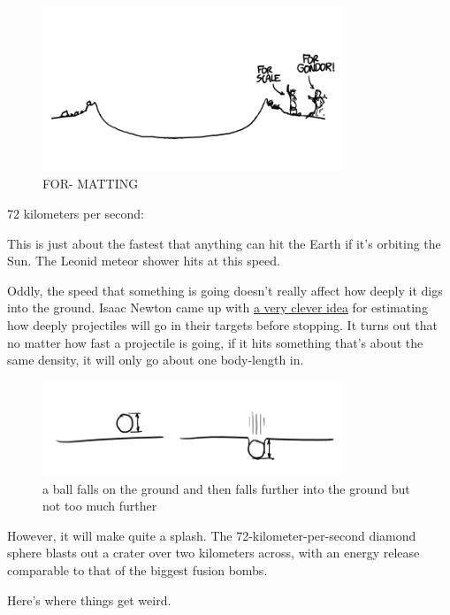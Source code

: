 \begin{figure}[!htbp]
\centering
\includegraphics[scale=0.5, max width=0.8\textwidth]{imgs/a/20/diamond_11.png}
\caption{FOR- MATTING}
\end{figure}

{72 kilometers per second:}

{This is just about the fastest that anything can hit the Earth if it’s orbiting the Sun. The Leonid meteor shower hits at this speed.}

{Oddly, the speed that something is going doesn’t really affect how deeply it digs into the ground. Isaac Newton came up with \href{http://en.wikipedia.org/wiki/Impact\_depth}{a very clever idea} for estimating how deeply projectiles will go in their targets before stopping. It turns out that no matter how fast a projectile is going, if it hits something that’s about the same density, it will only go about one body-length in.}

\begin{figure}[!htbp]
\centering
\includegraphics[scale=0.5, max width=0.8\textwidth]{imgs/a/20/diamond_momentum.png}
\caption{a ball falls on the ground and then falls further into the ground but not too much further}
\end{figure}

{However, it will make quite a splash. The 72-kilometer-per-second diamond sphere blasts out a crater over two kilometers across, with an energy release comparable to that of the biggest fusion bombs.}

{Here’s where things get weird.}

